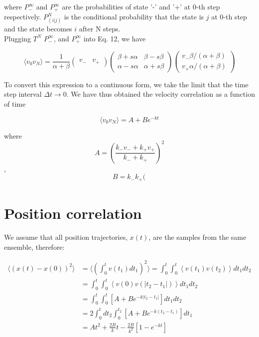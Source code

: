 \documentclass{article}
\begin{document}
where $P_-^{\infty}$ and $P_+^{\infty}$ are the probabilities of state '-' and '+' at 0-th step respectively. $P_{(i|j)}^N$ is the conditional probability that the state is $j$ at 0-th step and the state becomes $i$ after N steps. \\
Plugging $T^N$ $P_-^{\infty}$, and $P_+^{\infty}$ into Eq. 12, we have

\begin{equation}
    \langle v_0 v_N \rangle=
    \frac{1}{\alpha + \beta}
    \begin{pmatrix} v_- & v_+\end{pmatrix}
    \begin{pmatrix} 
        \beta + s \alpha & \beta - s \beta \\ \alpha - s \alpha & \alpha + s \beta 
    \end{pmatrix}
    \begin{pmatrix} 
        v_- \beta / (\alpha + \beta) \\
        v_+ \alpha / (\alpha + \beta)
    \end{pmatrix}
\end{equation}

To convert this expression to a continuous form, we take the limit that the time step interval $\Delta t \rightarrow 0$. We have thus obtained the velocity correlation as a function of time

\begin{equation}
    \langle v_0 v_N \rangle=A+Be^{-kt}
\end{equation}

where \[A=(\frac{k_- v_- + k_+ v_+}{k_- + k_+})^2\], \[B=k_- k_+ (\frac{}{}\]

\section{Position correlation}

We assume that all position trajectories, $x(t)$, are the samples from the same ensemble, therefore:

\begin{equation}
    \begin{aligned}
    \langle (x(t) - x(0))^2 \rangle 
    &= \langle ( \int_0^t v(t_1) dt_1 )^2 \rangle  
    = \int_0^t \int_0^t \left\langle v(t_1) v(t_2) \right\rangle dt_1 dt_2 \\
    &= \int_0^t \int_0^t \left\langle v(0) v(|t_2 - t_1|) \right\rangle dt_1 dt_2 \\
    &= \int_0^t \int_0^t \left[ A + B e^{-k|t_2 - t_1|} \right] dt_1 dt_2 \\
    &= 2 \int_0^t dt_2 \int_0^{t_2} \left[ A + B e^{-k(t_2 - t_1)} \right] dt_1 \\
    &= At^2 + \frac{2B}{k} t - \frac{2B}{k^2} \left[ 1 - e^{-kt} \right] 
    \end{aligned}
\end{equation}
\end{document}
